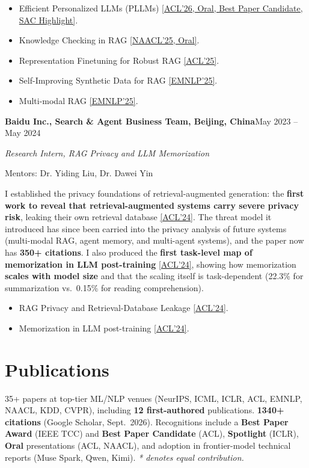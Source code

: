 \documentclass[12pt,letterpaper]{article}
\newcommand{\entry}[2]{\textbf{#1}\hfill #2\par}
\newcommand{\role}[1]{\textit{#1}\par}
\newcommand{\meta}[1]{{\small #1}\par}
\newcommand{\blurb}[1]{\vspace{0.25em}\par #1\par\vspace{0.25em}}
\begin{document}
\begin{itemize}
  \item Efficient Personalized LLMs (PLLMs) \href{https://arxiv.org/abs/2602.07778}{[ACL'26, Oral, Best Paper Candidate, SAC Highlight]}.
  \item Knowledge Checking in RAG \href{https://arxiv.org/abs/2411.14572}{[NAACL'25, Oral]}.
  \item Representation Finetuning for Robust RAG \href{https://arxiv.org/abs/2502.14100}{[ACL'25]}.
  \item Self-Improving Synthetic Data for RAG \href{https://arxiv.org/abs/2406.14773}{[EMNLP'25]}.
  \item Multi-modal RAG \href{https://arxiv.org/abs/2505.13957}{[EMNLP'25]}.
\end{itemize}
\vspace{0.5em}
\entry{Baidu Inc., Search \& Agent Business Team, Beijing, China}{May 2023 -- May 2024}
\role{Research Intern, RAG Privacy and LLM Memorization}
\meta{Mentors: Dr. Yiding Liu, Dr. Dawei Yin}
\blurb{I established the privacy foundations of retrieval-augmented generation: the \textbf{first work to reveal that retrieval-augmented systems carry severe privacy risk}, leaking their own retrieval database \href{https://arxiv.org/abs/2402.16893}{[ACL'24]}. The threat model it introduced has since been carried into the privacy analysis of future systems (multi-modal RAG, agent memory, and multi-agent systems), and the paper now has \textbf{350+ citations}. I also produced the \textbf{first task-level map of memorization in LLM post-training} \href{https://arxiv.org/abs/2310.06714}{[ACL'24]}, showing how memorization \textbf{scales with model size} and that the scaling itself is task-dependent (22.3\% for summarization vs.\ 0.15\% for reading comprehension).}
\begin{itemize}
  \item RAG Privacy and Retrieval-Database Leakage \href{https://arxiv.org/abs/2402.16893}{[ACL'24]}.
  \item Memorization in LLM post-training \href{https://arxiv.org/abs/2310.06714}{[ACL'24]}.
\end{itemize}

\section{Publications}
35+ papers at top-tier ML/NLP venues (NeurIPS, ICML, ICLR, ACL, EMNLP, NAACL, KDD, CVPR), including
\textbf{12 first-authored} publications. \textbf{1340+ citations} (Google Scholar, Sept.\ 2026).
Recognitions include a \textbf{Best Paper Award} (IEEE TCC) and \textbf{Best Paper Candidate} (ACL), \textbf{Spotlight} (ICLR), \textbf{Oral} presentations (ACL, NAACL), and adoption in frontier-model technical reports (Muse Spark, Qwen, Kimi).
\textit{* denotes equal contribution.}
\end{document}
